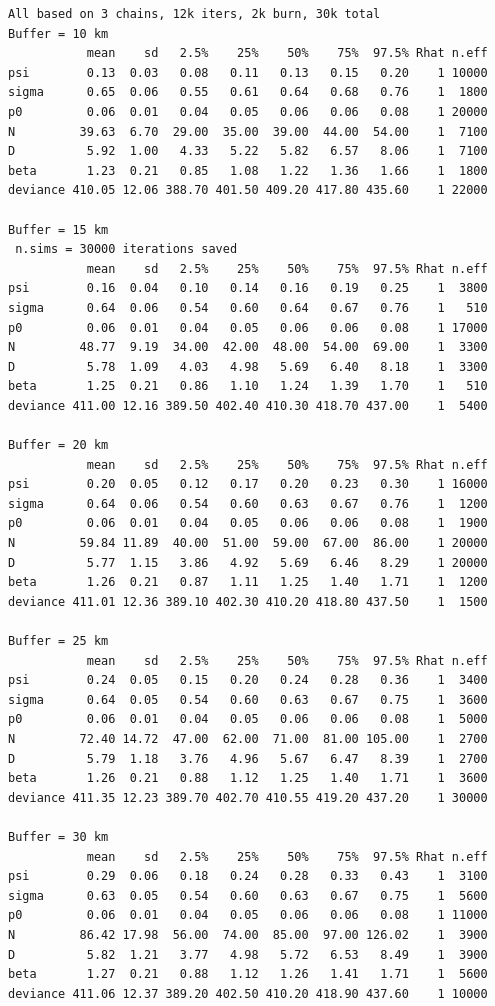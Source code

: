 {\small
\begin{verbatim}
All based on 3 chains, 12k iters, 2k burn, 30k total
Buffer = 10 km
           mean    sd   2.5%    25%    50%    75%  97.5% Rhat n.eff
psi        0.13  0.03   0.08   0.11   0.13   0.15   0.20    1 10000
sigma      0.65  0.06   0.55   0.61   0.64   0.68   0.76    1  1800
p0         0.06  0.01   0.04   0.05   0.06   0.06   0.08    1 20000
N         39.63  6.70  29.00  35.00  39.00  44.00  54.00    1  7100
D          5.92  1.00   4.33   5.22   5.82   6.57   8.06    1  7100
beta       1.23  0.21   0.85   1.08   1.22   1.36   1.66    1  1800
deviance 410.05 12.06 388.70 401.50 409.20 417.80 435.60    1 22000

Buffer = 15 km
 n.sims = 30000 iterations saved
           mean    sd   2.5%    25%    50%    75%  97.5% Rhat n.eff
psi        0.16  0.04   0.10   0.14   0.16   0.19   0.25    1  3800
sigma      0.64  0.06   0.54   0.60   0.64   0.67   0.76    1   510
p0         0.06  0.01   0.04   0.05   0.06   0.06   0.08    1 17000
N         48.77  9.19  34.00  42.00  48.00  54.00  69.00    1  3300
D          5.78  1.09   4.03   4.98   5.69   6.40   8.18    1  3300
beta       1.25  0.21   0.86   1.10   1.24   1.39   1.70    1   510
deviance 411.00 12.16 389.50 402.40 410.30 418.70 437.00    1  5400

Buffer = 20 km
           mean    sd   2.5%    25%    50%    75%  97.5% Rhat n.eff
psi        0.20  0.05   0.12   0.17   0.20   0.23   0.30    1 16000
sigma      0.64  0.06   0.54   0.60   0.63   0.67   0.76    1  1200
p0         0.06  0.01   0.04   0.05   0.06   0.06   0.08    1  1900
N         59.84 11.89  40.00  51.00  59.00  67.00  86.00    1 20000
D          5.77  1.15   3.86   4.92   5.69   6.46   8.29    1 20000
beta       1.26  0.21   0.87   1.11   1.25   1.40   1.71    1  1200
deviance 411.01 12.36 389.10 402.30 410.20 418.80 437.50    1  1500

Buffer = 25 km
           mean    sd   2.5%    25%    50%    75%  97.5% Rhat n.eff
psi        0.24  0.05   0.15   0.20   0.24   0.28   0.36    1  3400
sigma      0.64  0.05   0.54   0.60   0.63   0.67   0.75    1  3600
p0         0.06  0.01   0.04   0.05   0.06   0.06   0.08    1  5000
N         72.40 14.72  47.00  62.00  71.00  81.00 105.00    1  2700
D          5.79  1.18   3.76   4.96   5.67   6.47   8.39    1  2700
beta       1.26  0.21   0.88   1.12   1.25   1.40   1.71    1  3600
deviance 411.35 12.23 389.70 402.70 410.55 419.20 437.20    1 30000

Buffer = 30 km
           mean    sd   2.5%    25%    50%    75%  97.5% Rhat n.eff
psi        0.29  0.06   0.18   0.24   0.28   0.33   0.43    1  3100
sigma      0.63  0.05   0.54   0.60   0.63   0.67   0.75    1  5600
p0         0.06  0.01   0.04   0.05   0.06   0.06   0.08    1 11000
N         86.42 17.98  56.00  74.00  85.00  97.00 126.02    1  3900
D          5.82  1.21   3.77   4.98   5.72   6.53   8.49    1  3900
beta       1.27  0.21   0.88   1.12   1.26   1.41   1.71    1  5600
deviance 411.06 12.37 389.20 402.50 410.20 418.90 437.60    1 10000


\end{verbatim}}
